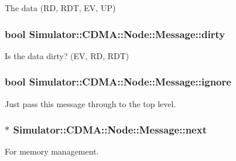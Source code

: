 The data (R\+D, R\+D\+T, E\+V, U\+P) 

\hypertarget{union_simulator_1_1_c_d_m_a_1_1_node_1_1_message_a40adca4a041526242a87a513b6490af6}{
\subsubsection[{dirty}]{\setlength{\rightskip}{0pt plus 5cm}bool Simulator\+::\+C\+D\+M\+A\+::\+Node\+::\+Message\+::dirty}}\label{union_simulator_1_1_c_d_m_a_1_1_node_1_1_message_a40adca4a041526242a87a513b6490af6}


Is the data dirty? (E\+V, R\+D, R\+D\+T) 

\hypertarget{union_simulator_1_1_c_d_m_a_1_1_node_1_1_message_a8f8af70650fb46cf43d6cb088770da4d}{
\subsubsection[{ignore}]{\setlength{\rightskip}{0pt plus 5cm}bool Simulator\+::\+C\+D\+M\+A\+::\+Node\+::\+Message\+::ignore}}\label{union_simulator_1_1_c_d_m_a_1_1_node_1_1_message_a8f8af70650fb46cf43d6cb088770da4d}


Just pass this message through to the top level. 

\hypertarget{union_simulator_1_1_c_d_m_a_1_1_node_1_1_message_a9cc157f9a6cef35bacc0d630c333d18f}{
\subsubsection[{next}]{$\ast$ Simulator\+::\+C\+D\+M\+A\+::\+Node\+::\+Message\+::next}}\label{union_simulator_1_1_c_d_m_a_1_1_node_1_1_message_a9cc157f9a6cef35bacc0d630c333d18f}


For memory management. 

